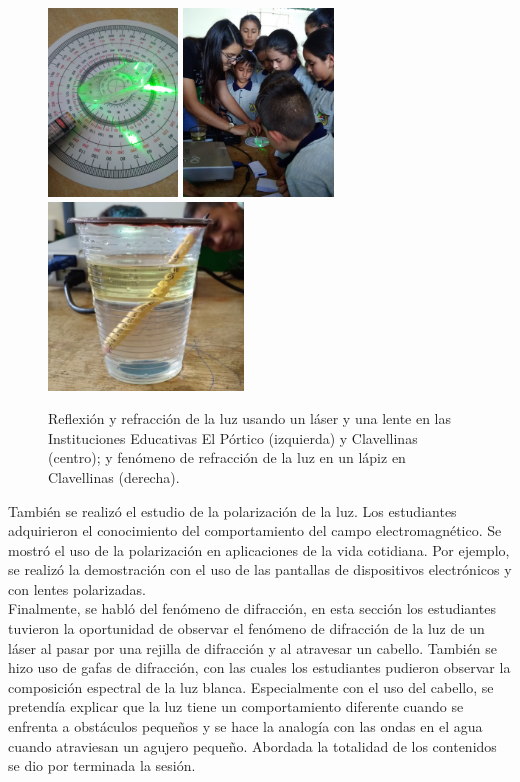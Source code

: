 \documentclass[a4paper,10pt]{article}
\begin{document}
\begin{figure}[H]
    \centering
    \includegraphics[height=5cm]{Imagenes/laserlente.jpg}
    \includegraphics[height=5cm]{Imagenes/laserclave.jpg}
    \includegraphics[height=5cm]{Imagenes/lapiz.jpg}
    \caption{Reflexión y refracción de la luz usando un láser y una lente en las Instituciones Educativas El Pórtico (izquierda) y Clavellinas (centro); y fenómeno de refracción de la luz en un lápiz en Clavellinas (derecha).}
\end{figure}


\noindent También se realizó el estudio de la polarización de la luz. Los estudiantes adquirieron el conocimiento del comportamiento del campo electromagnético. Se mostró el uso de la polarización en aplicaciones de la vida cotidiana. Por ejemplo, se realizó la demostración con el uso de las pantallas de dispositivos electrónicos y con lentes polarizadas.\\

\noindent Finalmente, se habló del fenómeno de difracción, en esta sección los estudiantes tuvieron la oportunidad de observar el fenómeno de difracción de la luz de un láser al pasar por una rejilla de difracción y al atravesar un cabello. También se hizo uso de gafas de difracción, con las cuales los estudiantes pudieron observar la composición espectral de la luz blanca. Especialmente con el uso del cabello, se pretendía explicar que la luz tiene un comportamiento diferente cuando se enfrenta a obstáculos pequeños y se hace la analogía con las ondas en el agua cuando atraviesan un agujero pequeño. Abordada la totalidad de los contenidos se dio por terminada la sesión.
\end{document}
